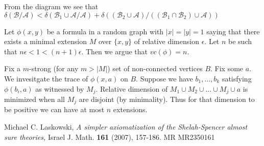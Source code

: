 \documentclass{amsart}
\newcommand{\A}{\mathcal A}
\newcommand{\B}{\mathcal B}
\begin{document}
From the diagram we see that $\delta(\B/\A) < \delta(\B_1 \cup \A/\A) + \delta\left((\B_2 \cup \A)/((\B_1 \cap \B_2) \cup \A)\right)$



Let $\phi(x,y)$ be a formula in a random graph with $|x|=|y|=1$ saying that there exists a minimal extension $M$ over $\{x,y\}$ of relative dimension $\epsilon$. Let $n$ be such that $n\epsilon < 1 < (n+1)\epsilon$. Then we argue that $vc(\phi) = n$.

Fix a $m$-strong (for any $m > |M|$) set of non-connected vertices $B$. Fix some $a$. We invesitgate the trace of $\phi(x, a)$ on $B$. Suppose we have $b_1, \ldots, b_k$ satisfying $\phi(b_i, a)$ as witnessed by $M_j$. Relative dimension of $M_1 \cup M_2 \cup \ldots \cup M_j \cup {a}$ is minimized when all $M_j$ are disjoint (by minimality). Thus for that dimension to be positive we can have at most $n$ extensions.

\begin{thebibliography}{9}

	Michael C. Laskowski, \textsl{A simpler axiomatization of the Shelah-Spencer almost sure theories,}
	Israel J. Math. \textbf{161} (2007), 157-186. MR MR2350161

\end{thebibliography}
\end{document}
